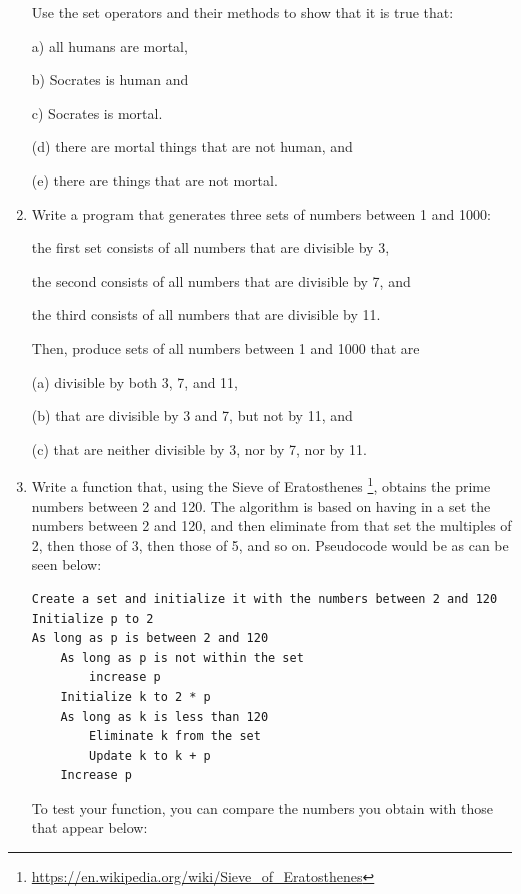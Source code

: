\documentclass[
  fontsize=10pt,
  a4paper,
]{scrartcl}
\newcommand\solucion[1]{}
\begin{document}
\begin{enumerate}
Use the set operators and their methods to show that it is true that:

a) all humans are mortal,

b) Socrates is human and

c) Socrates is mortal.

(d) there are mortal things that are not human, and

(e) there are things that are not mortal.


\item Write a program that generates three sets of numbers between 1 and 1000:

the first set consists of all numbers that are divisible by 3,

the second consists of all numbers that are divisible by 7, and

the third consists of all numbers that are divisible by 11.

Then, produce sets of all numbers between 1 and 1000 that are

(a) divisible by both 3, 7, and 11,

(b) that are divisible by 3 and 7, but not by 11, and

(c) that are neither divisible by 3, nor by 7, nor by 11.



\item Write a  function that, using the Sieve of Eratosthenes \footnote{\url{https://en.wikipedia.org/wiki/Sieve_of_Eratosthenes}}, obtains the prime numbers between 2 and 120. The algorithm is based on having in a set the numbers between 2 and 120, and then eliminate from that set the multiples of 2, then those of 3, then those of 5, and so on. Pseudocode would be as can be seen below:
\begin{verbatim}
Create a set and initialize it with the numbers between 2 and 120
Initialize p to 2
As long as p is between 2 and 120
    As long as p is not within the set
        increase p
    Initialize k to 2 * p
    As long as k is less than 120
        Eliminate k from the set
        Update k to k + p
    Increase p
\end{verbatim}
\solucion{
numbers=set(range(2,120))
p = 2
while p < 120:
    while p not in numbers:
        p = p + 1
    k = 2 * p
    while k < 120:
        numbers.discard(k)
        k = k + p
    p = p + 1

print("the prime numbers are: ")
print(numbers)
}

To test your function, you can compare the numbers you obtain with those that appear below:


\end{enumerate}

\printbibliography
\end{document}
